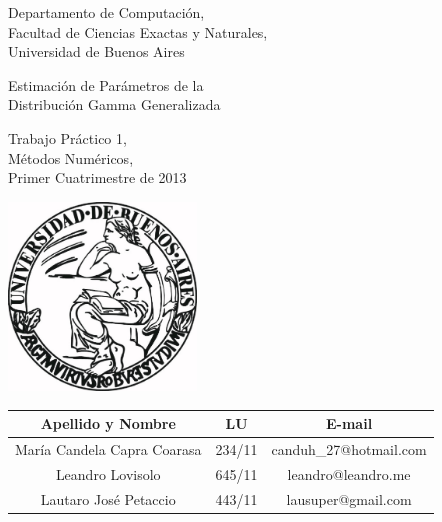 \documentclass[a4paper,10pt,twoside]{article}
\begin{document}


\thispagestyle{caratula}

\begin{center}

Departamento de Computación,\\
Facultad de Ciencias Exactas y Naturales,\\
Universidad de Buenos Aires

\begin{spacing}{2.5}
\begin{Huge}
Estimación de Parámetros de la\\
Distribución Gamma Generalizada
\end{Huge}
\end{spacing}

\vspace{1cm}

Trabajo Práctico 1, \\
Métodos Numéricos, \\
Primer Cuatrimestre de 2013

\vspace{1cm}

\includegraphics[width=5cm]{UBA.jpg} 

\vspace{1cm}

\begin{tabular}{|c|c|c|}
\hline
Apellido y Nombre & LU & E-mail\\
\hline
María Candela Capra Coarasa & 234/11 & canduh\_27@hotmail.com\\
Leandro Lovisolo            & 645/11 & leandro@leandro.me\\
Lautaro José Petaccio       & 443/11 & lausuper@gmail.com\\
\hline
\end{tabular}

\end{center}
\end{document}
